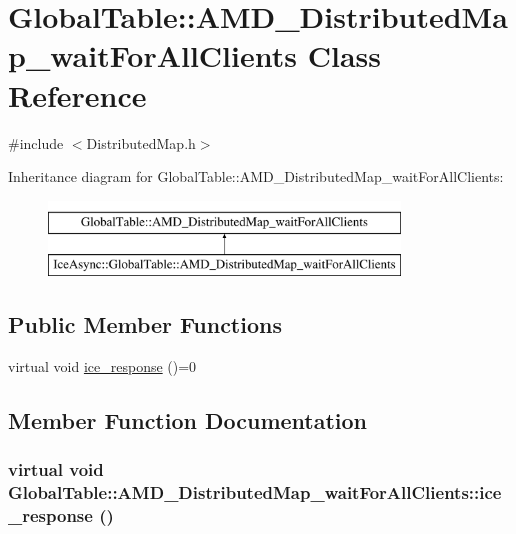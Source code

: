 \hypertarget{class_global_table_1_1_a_m_d___distributed_map__wait_for_all_clients}{
\section{GlobalTable::AMD\_\-DistributedMap\_\-waitForAllClients Class Reference}
\label{class_global_table_1_1_a_m_d___distributed_map__wait_for_all_clients}
}


{\ttfamily \#include $<$DistributedMap.h$>$}

Inheritance diagram for GlobalTable::AMD\_\-DistributedMap\_\-waitForAllClients:\begin{figure}[H]
\begin{center}
\leavevmode
\includegraphics[height=2cm]{class_global_table_1_1_a_m_d___distributed_map__wait_for_all_clients}
\end{center}
\end{figure}
\subsection*{Public Member Functions}
\begin{DoxyCompactItemize}
\item 
virtual void \hyperlink{class_global_table_1_1_a_m_d___distributed_map__wait_for_all_clients_ad65fc8a54f2504c84eb145d310be1b20}{ice\_\-response} ()=0
\end{DoxyCompactItemize}


\subsection{Member Function Documentation}
\hypertarget{class_global_table_1_1_a_m_d___distributed_map__wait_for_all_clients_ad65fc8a54f2504c84eb145d310be1b20}{
\subsubsection[{ice\_\-response}]{\setlength{\rightskip}{0pt plus 5cm}virtual void GlobalTable::AMD\_\-DistributedMap\_\-waitForAllClients::ice\_\-response ()}}
\label{class_global_table_1_1_a_m_d___distributed_map__wait_for_all_clients_ad65fc8a54f2504c84eb145d310be1b20}


